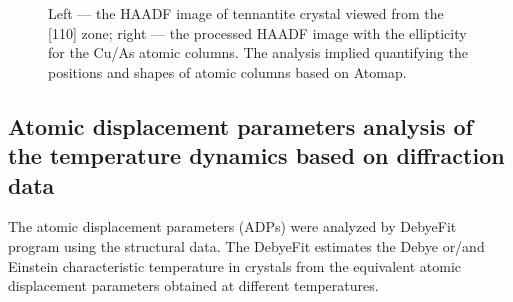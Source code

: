 \documentclass[preprint,review,12pt]{elsarticle}
\begin{document}
\begin{figure}[ht]
\centering
{}
 \quad
{}
\caption{\label{fig:micro} Left --- the HAADF image of tennantite crystal viewed from the [110] zone; right --- the processed HAADF image with the ellipticity for the Cu/As atomic columns. The analysis implied quantifying the positions and shapes of atomic columns based on Atomap\cite{Nord2017}. }
\end{figure}


\subsection{Atomic displacement parameters analysis of the temperature dynamics based on diffraction data}\label{sec:level2}

The atomic displacement parameters (ADPs) were analyzed by DebyeFit program using the structural data.
The DebyeFit estimates the Debye or/and Einstein characteristic temperature in crystals from the equivalent atomic displacement parameters obtained at different temperatures.
\end{document}
